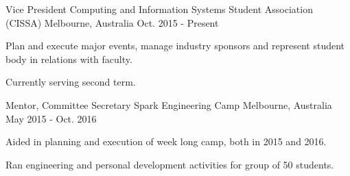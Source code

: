 \begin{cventries}
  \cventry
    {Vice President}
    {Computing and Information Systems Student Association (CISSA)}
    {Melbourne, Australia}
    {Oct. 2015 - Present}
    {
      \begin{cvitems}
        \item {Plan and execute major events, manage industry sponsors and represent student body in relations with faculty.}
        \item {Currently serving second term.}
      \end{cvitems}
    }
    \cventry
    {Mentor, Committee Secretary}
    {Spark Engineering Camp}
    {Melbourne, Australia}
    {May 2015 - Oct. 2016}
    {
      \begin{cvitems}
        \item {Aided in planning and execution of week long camp, both in 2015 and 2016.}
        \item {Ran engineering and personal development activities for group of 50 students. }
      \end{cvitems}
    }
\end{cventries}
